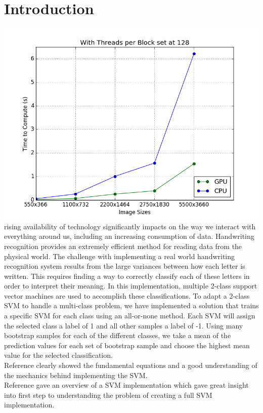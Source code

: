 \documentclass[journal]{IEEEtran}
\begin{document}
\section{Introduction}
\includegraphics{SizeTime}
 rising availability of technology significantly impacts on the way we interact with everything around us, including an increasing consumption of data. Handwriting recognition provides an extremely efficient method for reading data from the physical world. The challenge with implementing a real world handwriting recognition system results from the large variances between how each letter is written. This requires finding a way to correctly classify each of these letters in order to interpret their meaning. In this implementation, multiple 2-class support vector machines are used to accomplish these classifications. To adapt a 2-class SVM to handle a multi-class problem, we have implemented a solution that trains a specific SVM for each class using an all-or-none method. Each SVM will assign the selected class a label of 1 and all other samples a label of -1. Using many bootstrap samples for each of the different classes, we take a mean of the prediction values for each set of bootstrap sample and choose the highest mean value for the selected classification.\\

Reference \cite{BishopBook} clearly showed the fundamental equations and a good understanding of the mechanics behind implementing the SVM.\\

Reference \cite{TullochSVMpy} gave an overview of a SVM implementation which gave great insight into first step to understanding the problem of creating a full SVM implementation.\\
\end{document}
